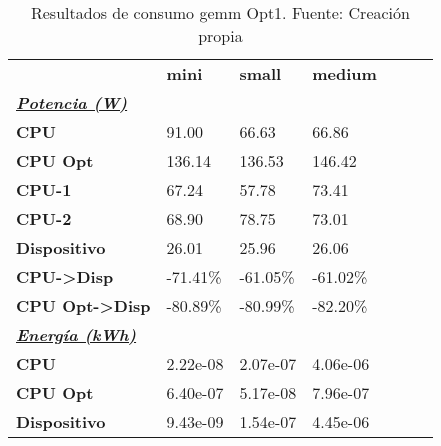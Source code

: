 \begin{table}[H]
    \centering
    \begin{tabular}{lllllll}
    \rowcolor[HTML]{DAE8FC} \ & \textbf{mini} & \textbf{	small} & \textbf{	medium} \\
    \cellcolor[HTML]{DAE8FC} \textbf{\textbf{{\emph{{\underline{{Potencia (W)}}}}}}} &  & 	 & 	 \\
    \rowcolor[HTML]{EFEFEF} \cellcolor[HTML]{DAE8FC} \textbf{CPU} & 91.00 & 	66.63 & 	66.86 \\
    \cellcolor[HTML]{DAE8FC} \textbf{CPU Opt} & 136.14 & 	136.53 & 	146.42 \\
    \rowcolor[HTML]{EFEFEF} \cellcolor[HTML]{DAE8FC} \textbf{\quad CPU-1} & 67.24 & 	57.78 & 	73.41 \\
    \cellcolor[HTML]{DAE8FC} \textbf{\quad CPU-2} & 68.90 & 	78.75 & 	73.01 \\
    \rowcolor[HTML]{EFEFEF} \cellcolor[HTML]{DAE8FC} \textbf{Dispositivo} & 26.01 & 	25.96 & 	26.06 \\
    \cellcolor[HTML]{DAE8FC} \textbf{CPU->Disp} & -71.41\% & 	-61.05\% & 	-61.02\% \\
    \rowcolor[HTML]{EFEFEF} \cellcolor[HTML]{DAE8FC} \textbf{CPU Opt->Disp} & -80.89\% & 	-80.99\% & 	-82.20\% \\
    \cellcolor[HTML]{DAE8FC} \textbf{\textbf{{\emph{{\underline{{Energía (kWh)}}}}}}} &  & 	 & 	 \\
    \rowcolor[HTML]{EFEFEF} \cellcolor[HTML]{DAE8FC} \textbf{CPU} & 2.22e-08 & 	2.07e-07 & 	4.06e-06 \\
    \cellcolor[HTML]{DAE8FC} \textbf{CPU Opt} & 6.40e-07 & 	5.17e-08 & 	7.96e-07 \\
    \rowcolor[HTML]{EFEFEF} \cellcolor[HTML]{DAE8FC} \textbf{Dispositivo} & 9.43e-09 & 	1.54e-07 & 	4.45e-06 \\
    \end{tabular}
    \caption[Resultados de consumo gemm Opt1]{{Resultados de consumo gemm Opt1. Fuente: Creación propia}}
    \label{table_test_gemm_Opt1_hw_powerResults}
\end{table}
